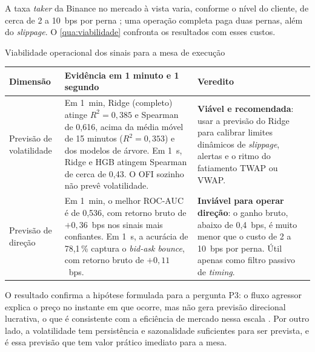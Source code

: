 A taxa \textit{taker} da Binance no mercado à vista varia, conforme o nível do
cliente, de cerca de 2 a 10~bps por perna \cite{binancefees}; uma operação
completa paga duas pernas, além do \textit{slippage}. O \autoref{qua:viabilidade}
confronta os resultados com esses custos.

\begin{quadro}[htbp]
\caption{\label{qua:viabilidade}Viabilidade operacional dos sinais para a mesa de execução}
\begin{corpotabela}
\begin{tabularx}{\textwidth}{|L{2.6cm}|Y|L{4.4cm}|}
\hline
\textbf{Dimensão} & \textbf{Evidência em 1 minuto e 1 segundo} & \textbf{Veredito} \\ \hline
Previsão de volatilidade & Em 1~min, Ridge (completo) atinge $R^2 = 0,385$ e Spearman de 0,616, acima da média móvel de 15 minutos ($R^2 = 0,353$) e dos modelos de árvore. Em 1~s, Ridge e HGB atingem Spearman de cerca de 0,43. O OFI sozinho não prevê volatilidade. & \textbf{Viável e recomendada}: usar a previsão do Ridge para calibrar limites dinâmicos de \textit{slippage}, alertas e o ritmo do fatiamento TWAP ou VWAP. \\ \hline
Previsão de direção & Em 1~min, o melhor ROC-AUC é de 0,536, com retorno bruto de $+0,36$~bps nos sinais mais confiantes. Em 1~s, a acurácia de 78,1\,\% captura o \textit{bid-ask bounce}, com retorno bruto de $+0,11$~bps. & \textbf{Inviável para operar direção}: o ganho bruto, abaixo de 0,4~bps, é muito menor que o custo de 2 a 10~bps por perna. Útil apenas como filtro passivo de \textit{timing}. \\ \hline
\end{tabularx}
\end{corpotabela}
\fonteautores[Elaborado]
\end{quadro}

O resultado confirma a hipótese formulada para a pergunta P3: o fluxo agressor
explica o preço no instante em que ocorre, mas não gera previsão direcional
lucrativa, o que é consistente com a eficiência de mercado nessa escala
\cite{fama1970}. Por outro lado, a volatilidade tem persistência e sazonalidade
suficientes para ser prevista, e é essa previsão que tem valor prático imediato
para a mesa.
